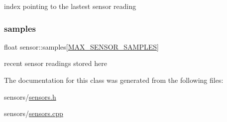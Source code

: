 index pointing to the lastest sensor reading \mbox{\label{classsensor_a795220a22d60a8babb9383b002342220}} 
\subsubsection{\texorpdfstring{samples}{samples}}
{\footnotesize\ttfamily float sensor\+::samples\mbox{[}\hyperlink{group___base_sensors_module_ga758742adca8f7b427482748255303be6}{M\+A\+X\+\_\+\+S\+E\+N\+S\+O\+R\+\_\+\+S\+A\+M\+P\+L\+ES}\mbox{]}}

recent sensor readings stored here 

The documentation for this class was generated from the following files\+:\begin{DoxyCompactItemize}
\item 
sensors/\hyperlink{sensors_8h}{sensors.\+h}\item 
sensors/\hyperlink{sensors_8cpp}{sensors.\+cpp}\end{DoxyCompactItemize}
